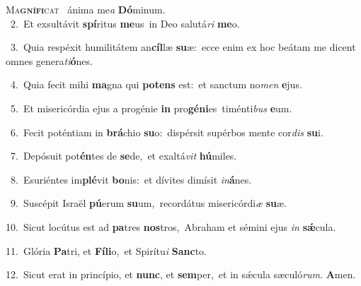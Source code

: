 \lettrine{\initial\textcolor{\initialcolor}{M}}{a\-\textbf{gní}\-\textbf{fi}cat~\star} ánima me\textit{a} \textbf{Dó}\-minum.\\
{\numbfont\textcolor{\numbcolor}{~2.}}~Et exsultávit \textbf{spí}\-ritus \textbf{me}\-us~\star in Deo salutá\textit{ri} \textbf{me}\-o.\par
{\numbfont\textcolor{\numbcolor}{~3.}}~Quia respéxit humilitátem an\-\textbf{cíl}\-læ \textbf{su}\-æ:~\star ecce enim ex hoc beátam me dicent omnes genera\-\textit{ti}\-\textbf{ó}nes.\par
{\numbfont\textcolor{\numbcolor}{~4.}}~Quia fecit mihi \textbf{ma}\-gna qui \textbf{pot}\-\textbf{ens} est:~\star et sanctum no\textit{men} \textbf{e}\-jus.\par
{\numbfont\textcolor{\numbcolor}{~5.}}~Et misericórdia ejus a progénie \textbf{in} pro\-\textbf{gé}\-\textbf{ni}es~\star timénti\textit{bus} \textbf{e}\-um.\par
{\numbfont\textcolor{\numbcolor}{~6.}}~Fecit poténtiam in \textbf{brá}\-chio \textbf{su}\-o:~\star dispérsit supérbos mente cor\textit{dis} \textbf{su}\-i.\par
{\numbfont\textcolor{\numbcolor}{~7.}}~Depósuit pot\-\textbf{én}\-tes de \textbf{se}\-de,~\star et exaltá\textit{vit} \textbf{hú}\-miles.\par
{\numbfont\textcolor{\numbcolor}{~8.}}~Esuriéntes im\-\textbf{plé}\-vit \textbf{bo}\-nis:~\star et dívites dimísit \textit{in}\-\textbf{á}nes.\par
{\numbfont\textcolor{\numbcolor}{~9.}}~Suscépit Israël \textbf{pú}\-erum \textbf{su}\-um,~\star recordátus misericórdi\textit{æ} \textbf{su}\-æ.\par
{\numbfont\textcolor{\numbcolor}{10.}}~Sicut locútus est ad \textbf{pa}\-tres \textbf{nos}\-tros,~\star Abraham et sémini ejus \textit{in} \textbf{sǽ}\-cula.\par
{\numbfont\textcolor{\numbcolor}{11.}}~Glória \textbf{Pa}\-tri, et \textbf{Fí}\-\textbf{li}o,~\star et Spirítu\textit{i} \textbf{Sanc}\-to.\par
{\numbfont\textcolor{\numbcolor}{12.}}~Sicut erat in princípio, et \textbf{nunc}\-, et \textbf{sem}\-per,~\star et in sǽcula sæculó\-\textit{rum}\-. \textbf{A}\-men.\par
